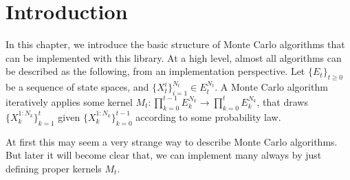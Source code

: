 \chapter{Introduction}
\label{chap:Introduction}

In this chapter, we introduce the basic structure of Monte Carlo algorithms
that can be implemented with this library. At a high level, almost all
algorithms can be described as the following, from an implementation
perspective. Let $\{E_t\}_{t\ge0}$ be a sequence of state spaces, and
$\{X_t^i\}_{i=1}^{N_t} \in E_t^{N_t}$. A Monte Carlo algorithm iteratively
applies some kernel $M_t:\prod_{k=0}^{t-1}E_k^{N_k}\to\prod_{k=0}^tE_k^{N_k}$,
that draws $\{X_k^{1:N_k}\}_{k=1}^t$ given $\{X_k^{1:N_k}\}_{k=0}^{t-1}$
according to some probability law.

At first this may seem a very strange way to describe Monte Carlo algorithms.
But later it will become clear that, we can implement many always by just
defining proper kernels $M_t$.
